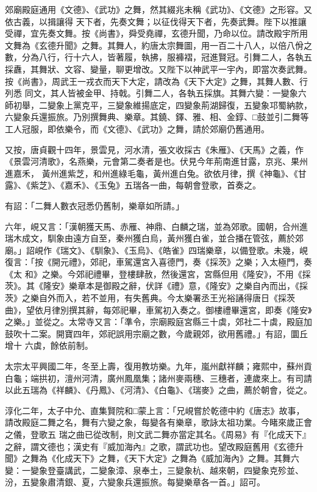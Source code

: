 \begin{pinyinscope}
 郊廟殿庭通用《文德》、《武功》之舞，然其綴兆未稱《武功》、《文德》之形容。又依古義，以揖讓得
 天下者，先奏文舞；以征伐得天下者，先奏武舞。陛下以推讓受禪，宜先奏文舞。按《尚書》，舜受堯禪，玄德升聞，乃命以位。請改殿宇所用文舞為《玄德升聞》之舞。其舞人，約唐太宗舞圖，用一百二十八人，以倍八佾之數，分為八行，行十六人，皆著履，執拂，服褲褶，冠進賢冠。引舞二人，各執五採纛，其舞狀、文容、變量，聊更增改。又陛下以神武平一宇內，即當次奏武舞。按《尚書》，周武王一戎衣而天下大定，請改為《天下大定》之舞，其舞人數、行列悉
 同文，其人皆被金甲、持戟。引舞二人，各執五採旗。其舞六變：一變象六師初舉，二變象上黨克平，三變象維揚底定，四變象荊湖歸復，五變象邛蜀納款，六變象兵還振旅。乃別撰舞典、樂章。其鐃、鐸、雅、相、金錞、□鼓並引二舞等工人冠服，即依樂令，而《文德》、《武功》之舞，請於郊廟仍舊通用。



 又按，唐貞觀十四年，景雲見，河水清，張文收採古《朱雁》、《天馬》之義，作《景雲河清歌》，名燕樂，元會第二奏者是也。伏見今年荊南進甘露，京兆、果州進嘉禾，
 黃州進紫芝，和州進綠毛龜，黃州進白兔。欲依月律，撰《神龜》、《甘露》、《紫芝》、《嘉禾》、《玉兔》五瑞各一曲，每朝會登歌，首奏之。



 有詔：「二舞人數衣冠悉仍舊制，樂章如所請。」



 六年，峴又言：「漢朝獲天馬、赤雁、神鼎、白麟之瑞，並為郊歌。國朝，合州進瑞木成文，馴象由遠方自至，秦州獲白烏，黃州獲白雀，並合播在管弦，薦於郊廟。」詔峴作《瑞文》、《馴象》、《玉烏》、《皓雀》四瑞樂章，以備登歌。未幾，峴復言：「按《開元禮》，郊祀，車駕還宮入喜德門，奏《採茨》之樂；入太極門，奏《太
 和》之樂。今郊祀禮畢，登樓肆赦，然後還宮，宮縣但用《隆安》，不用《採茨》。其《隆安》樂章本是御殿之辭，伏詳《禮》意，《隆安》之樂自內而出，《採茨》之樂自外而入，若不並用，有失舊典。今太樂署丞王光裕誦得唐日《採茨曲》，望依月律別撰其辭，每郊祀畢，車駕初入奏之。御樓禮畢還宮，即奏《隆安》之樂。」並從之。太常寺又言：「準令，宗廟殿庭宮縣三十虡，郊社二十虡，殿庭加鼓吹十二案。開寶四年，郊祀誤用宗廟之數，今歲親郊，欲用舊禮。」有詔，圜丘增十
 六虡，餘依前制。



 太宗太平興國二年，冬至上壽，復用教坊樂。九年，嵐州獻祥麟；雍熙中，蘇州貢白龜；端拱初，澶州河清，廣州鳳凰集；諸州麥兩穗、三穗者，連歲來上。有司請以此五瑞為《祥麟》、《丹鳳》、《河清》、《白龜》、《瑞麥》之曲，薦於朝會，從之。



 淳化二年，太子中允、直集賢院和□蒙上言：「兄峴嘗於乾德中約《唐志》故事，請改殿庭二舞之名，舞有六變之象，每變各有樂章，歌詠太祖功業。今睹來歲正會之儀，登歌五
 瑞之曲已從改制，則文武二舞亦當定其名。《周易》有『化成天下』之辭，謂文德也；漢史有『威加海內』之歌，謂武功也。望改殿庭舊用《玄德升聞》之舞為《化成天下》之舞，《天下大定》之舞為《威加海內》之舞。其舞六變：一變象登臺講武，二變象漳、泉奉土，三變象杭、越來朝，四變象克殄並、汾，五變象肅清銀、夏，六變象兵還振旅。每變樂章各一首。」詔可。




\end{pinyinscope}
